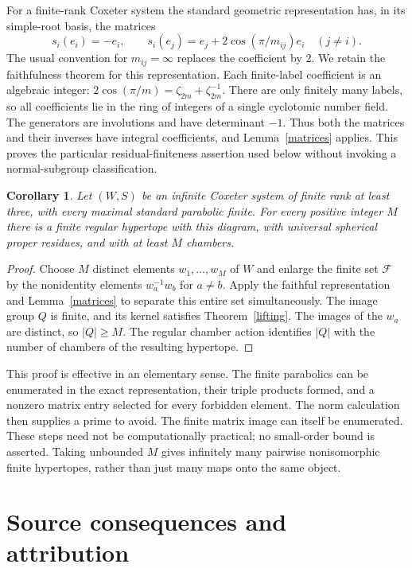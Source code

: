 \documentclass[11pt,a4paper]{article}
\newtheorem{corollary}[theorem]{Corollary}
\begin{document}
For a finite-rank Coxeter system the standard geometric representation
has, in its simple-root basis, the matrices
\[
 s_i(e_i)=-e_i,\qquad
 s_i(e_j)=e_j+2\cos(\pi/m_{ij})e_i\quad(j\ne i).
\]
The usual convention for $m_{ij}=\infty$ replaces the coefficient
by $2$. We retain the faithfulness theorem for this representation.
Each finite-label coefficient is an algebraic integer:
$2\cos(\pi/m)=\zeta_{2m}+\zeta_{2m}^{-1}$.
There are only finitely many labels, so all coefficients lie in the
ring of integers of a single cyclotomic number field. The generators
are involutions and have determinant $-1$. Thus both the matrices
and their inverses have integral coefficients, and Lemma~\ref{matrices}
applies. This proves the particular residual-finiteness assertion used
below without invoking a normal-subgroup classification.

\begin{corollary}\label{existence}
Let $(W,S)$ be an infinite Coxeter system of finite rank at least
three, with every maximal standard parabolic finite. For every
positive integer $M$ there is a finite regular hypertope with this
diagram, with universal spherical proper residues, and with at least
$M$ chambers.
\end{corollary}

\begin{proof}
Choose $M$ distinct elements $w_1,\ldots,w_M$ of $W$ and enlarge
the finite set $\mathcal F$ by the nonidentity elements
$w_a^{-1}w_b$ for $a\ne b$. Apply the faithful representation
and Lemma~\ref{matrices} to separate this entire set simultaneously.
The image group $Q$ is finite, and its kernel satisfies
Theorem~\ref{lifting}. The images of the $w_a$ are distinct,
so $|Q|\ge M$. The regular chamber action identifies $|Q|$ with
the number of chambers of the resulting hypertope.
\end{proof}

This proof is effective in an elementary sense. The finite parabolics
can be enumerated in the exact representation, their triple products
formed, and a nonzero matrix entry selected for every forbidden
element. The norm calculation then supplies a prime to avoid.
The finite matrix image can itself be enumerated. These steps need
not be computationally practical; no small-order bound is asserted.
Taking unbounded $M$ gives infinitely many pairwise nonisomorphic
finite hypertopes, rather than just many maps onto the same object.

\section{Source consequences and attribution}
\end{document}
